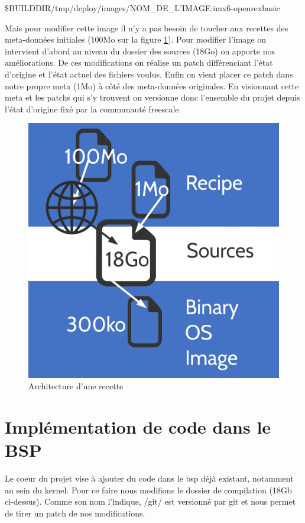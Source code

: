 \$BUILDDIR/tmp/deploy/images/{NOM\_DE\_L’IMAGE:imx6-openrexbasic} \medskip

Mais pour modifier cette image il n’y a pas besoin de toucher aux recettes des
meta-données initiales (100Mo sur la figure \ref{fig:recette}). Pour modifier l’image on intervient
d'abord au niveau du dossier des sources (18Go) on apporte nos améliorations. De ces
modifications on réalise un patch différenciant l’état d’origine et l’état actuel des fichiers
voulus. Enfin on vient placer ce patch dans notre propre meta (1Mo) à côté des
meta-données originales. En visionnant cette meta et les patchs qui s’y trouvent on
versionne donc l’ensemble du projet depuis l’état d’origine fixé par la communauté
freescale.

\begin{figure}[!htb]
    \centering
    \includegraphics[trim={0cm 0cm 0cm 0cm},clip,scale=0.1]{Figures/recette.png}
    \decoRule
    \caption{Architecture d'une recette} \label{fig:recette}
\end{figure} 

\section{Implémentation de code dans le BSP}

Le coeur du projet vise à ajouter du code dans le bsp déjà existant, notamment au sein du
kernel. Pour ce faire nous modifions le dossier de compilation (18Gb ci-dessus). Comme
son nom l’indique, /git/ est versionné par git et nous permet de tirer un patch de nos
modifications. \medskip

